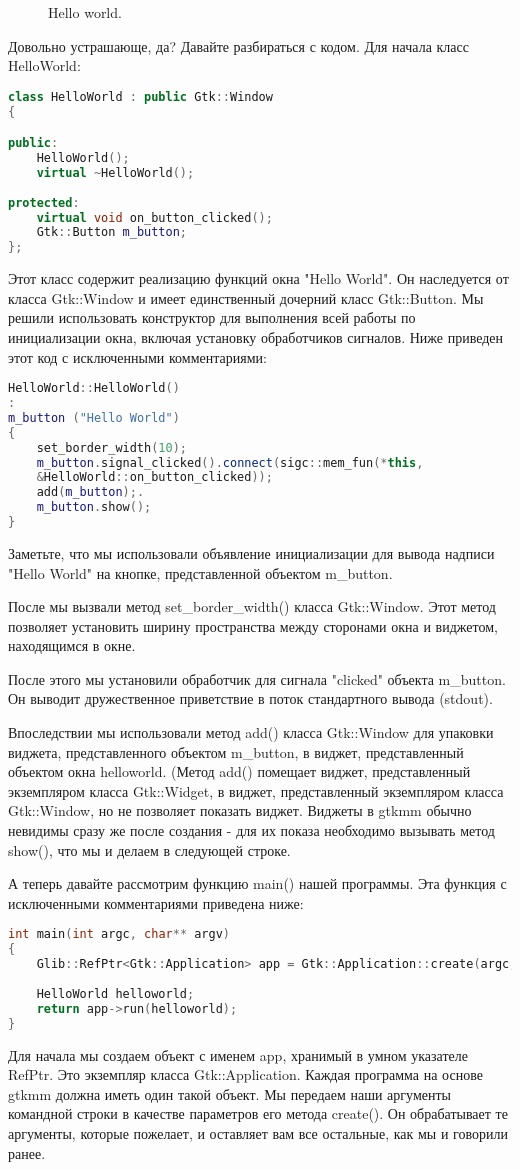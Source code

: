 \begin{figure}[h]
	\center{\texttt{[image: 31]}}
	\caption{Hello world.}
	\label{ris:image}
\end{figure}
Довольно устрашающе, да? Давайте разбираться с кодом. Для начала класс HelloWorld: 
\begin{lstlisting}[language=C++]
class HelloWorld : public Gtk::Window
{

public:
	HelloWorld();
	virtual ~HelloWorld();
	
protected:
	virtual void on_button_clicked();
	Gtk::Button m_button;
};
\end{lstlisting}
Этот класс содержит реализацию функций окна "Hello World". Он наследуется от класса Gtk::Window и имеет единственный дочерний класс Gtk::Button. Мы решили использовать конструктор для выполнения всей работы по инициализации окна, включая установку обработчиков сигналов. Ниже приведен этот код с исключенными комментариями: 

\begin{lstlisting}[language=C++]
HelloWorld::HelloWorld()
:
m_button ("Hello World")
{
	set_border_width(10);
	m_button.signal_clicked().connect(sigc::mem_fun(*this,
	&HelloWorld::on_button_clicked));
	add(m_button);.
	m_button.show();
}
\end{lstlisting}
 Заметьте, что мы использовали объявление инициализации для вывода надписи "Hello World" на кнопке, представленной объектом m\_button.

После мы вызвали метод set\_border\_width() класса Gtk::Window. Этот метод позволяет установить ширину пространства между сторонами окна и виджетом, находящимся в окне.

После этого мы установили обработчик для сигнала "clicked" объекта m\_button. Он выводит дружественное приветствие в поток стандартного вывода (stdout).

Впоследствии мы использовали метод add() класса Gtk::Window для упаковки виджета, представленного объектом m\_button, в виджет, представленный объектом окна helloworld. (Метод add() помещает виджет, представленный экземпляром класса Gtk::Widget, в виджет, представленный экземпляром класса Gtk::Window, но не позволяет показать виджет. Виджеты в gtkmm обычно невидимы сразу же после создания - для их показа необходимо вызывать метод show(), что мы и делаем в следующей строке.

А теперь давайте рассмотрим функцию main() нашей программы. Эта функция с исключенными комментариями приведена ниже: 
\begin{lstlisting}[language=C++]
int main(int argc, char** argv)
{
	Glib::RefPtr<Gtk::Application> app = Gtk::Application::create(argc, argv, 		"org.gtkmm.example");
	
	HelloWorld helloworld;
	return app->run(helloworld);
}
\end{lstlisting}
 Для начала мы создаем объект с именем app, хранимый в умном указателе RefPtr. Это экземпляр класса Gtk::Application. Каждая программа на основе gtkmm должна иметь один такой объект. Мы передаем наши аргументы командной строки в качестве параметров его метода create(). Он обрабатывает те аргументы, которые пожелает, и оставляет вам все остальные, как мы и говорили ранее.

